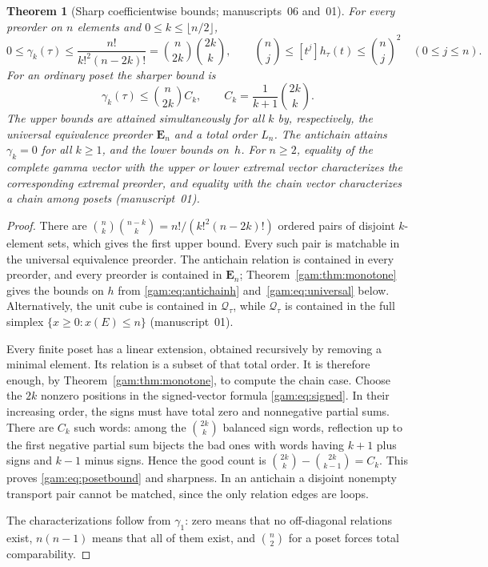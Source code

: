 \documentclass[11pt]{article}
\numberwithin{equation}{section}
\newtheorem{theorem}{Theorem}[section]
\theoremstyle{definition}
\newcommand{\Qt}{\mathcal Q_\tau}
\begin{document}
\begin{theorem}[Sharp coefficientwise bounds; manuscripts~06 and~01]\label{gam:thm:bounds}
For every preorder on $n$ elements and $0\le k\le\lfloor n/2\rfloor$,
\begin{equation}
 0\le\gamma_k(\tau)\le
     \frac{n!}{k!^2(n-2k)!}=\binom n{2k}\binom{2k}k,
 \qquad
 \binom n j\le[t^j]h_\tau(t)\le\binom n j^2\quad(0\le j\le n).
 \label{gam:eq:universalbound}
\end{equation}
For an ordinary poset the sharper bound is
\begin{equation}
 \gamma_k(\tau)\le\binom{n}{2k}C_k,
 \qquad C_k=\frac{1}{k+1}\binom{2k}{k}.
 \label{gam:eq:posetbound}
\end{equation}
The upper bounds are attained simultaneously for all $k$ by, respectively,
the universal equivalence preorder $\mathbf E_n$ and a total order $L_n$.
The antichain attains $\gamma_k=0$ for all $k\ge1$, and the lower bounds
on~$h$. For $n\ge2$, equality of the complete gamma vector with the upper
or lower extremal vector characterizes the corresponding extremal preorder,
and equality with the chain vector characterizes a chain among posets
(manuscript~01).
\end{theorem}
\begin{proof}
There are $\binom{n}{k}\binom{n-k}{k}=n!/(k!^2(n-2k)!)$ ordered pairs of
disjoint $k$-element sets, which gives the first upper bound. Every such
pair is matchable in the universal equivalence preorder. The antichain
relation is contained in every preorder, and every preorder is contained in
$\mathbf E_n$; Theorem~\ref{gam:thm:monotone} gives the bounds on $h$ from
\eqref{gam:eq:antichainh} and~\eqref{gam:eq:universal} below.
Alternatively, the unit cube is contained in $\Qt$, while $\Qt$ is contained
in the full simplex $\{x\ge0:x(E)\le n\}$ (manuscript~01).

Every finite poset has a linear extension, obtained recursively by removing
a minimal element. Its relation is a subset of that total order. It is
therefore enough, by Theorem~\ref{gam:thm:monotone}, to compute the chain case.
Choose the $2k$ nonzero positions in the signed-vector formula
\eqref{gam:eq:signed}. In their increasing order, the signs must have total zero
and nonnegative partial sums. There are $C_k$ such words: among the
$\binom{2k}{k}$ balanced sign words, reflection up to the first negative
partial sum bijects the bad ones with words having $k+1$ plus signs and
$k-1$ minus signs. Hence the good count is
$\binom{2k}{k}-\binom{2k}{k-1}=C_k$. This proves
\eqref{gam:eq:posetbound} and sharpness. In an antichain a disjoint nonempty
transport pair cannot be matched, since the only relation edges are loops.

The characterizations follow from $\gamma_1$: zero means that no
off-diagonal relations exist, $n(n-1)$ means that all of them exist, and
$\binom n2$ for a poset forces total comparability.
\end{proof}
\end{document}
